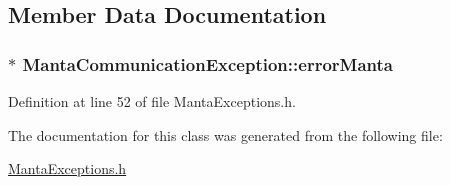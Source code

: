 \subsection{\-Member \-Data \-Documentation}
\hypertarget{classMantaCommunicationException_af45709267a3647656924868aabc04d92}{
\subsubsection[{error\-Manta}]{$\ast$ {\bf \-Manta\-Communication\-Exception\-::error\-Manta}}}\label{classMantaCommunicationException_af45709267a3647656924868aabc04d92}


\-Definition at line 52 of file \-Manta\-Exceptions.\-h.



\-The documentation for this class was generated from the following file\-:\begin{DoxyCompactItemize}
\item 
\hyperlink{MantaExceptions_8h}{\-Manta\-Exceptions.\-h}\end{DoxyCompactItemize}
